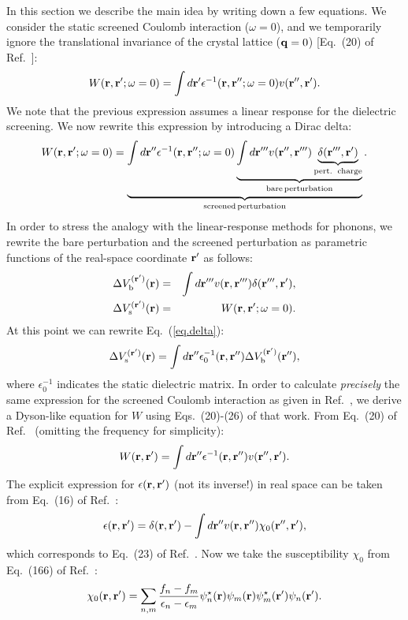 \documentclass[12pt]{article}
\def\q{{\bf q}}
\def\r{{\bf r}}
\def\rp{{\bf r}^\prime}
\def\rpp{{\bf r}^{\prime\prime}}
\def\rppp{{\bf r}^{\prime\prime\prime}}
\def\w{\omega}
\begin{document}
In this section we describe the main idea by writing down a few equations. We consider
the static screened Coulomb interaction ($\w=0$), and we temporarily ignore the translational
invariance of the crystal lattice ($\q=0$) [Eq.\ (20) of Ref.\ \cite{hl86}]:
  \begin{equation}
  W(\r,\rp;\w=0) = \int d\rp \epsilon^{-1}(\r,\rpp;\w=0) v(\rpp,\rp).
  \end{equation}
We note that the previous expression assumes a linear response for the dielectric screening.
We now rewrite this expression by introducing a Dirac delta:
  \begin{equation}\label{eq.delta}
  W(\r,\rp;\w=0) = \underbrace{ \int d\rpp \epsilon^{-1}(\r,\rpp;\w=0) 
  \underbrace{ \int d\rppp v(\rpp,\rppp) \underbrace{\delta(\rppp,\rp)}_{\rm pert.\ \, charge}}_{\rm bare \, perturbation}}
  _{\rm screened \, perturbation}.
  \end{equation}
In order to stress the analogy with the linear-response methods for phonons, we rewrite the bare perturbation
and the screened perturbation as parametric functions of the real-space coordinate $\rp$ as follows:
  \begin{eqnarray} \label{eq.deltavs}
  \Delta V_{\rm b}^{(\rp)} (\r)   &=& \int d\rppp v(\r,\rppp) \delta(\rppp,\rp),\\
  \Delta V_{\rm s}^{(\rp)} (\r) &=& W(\r,\rp;\w=0).
  \end{eqnarray}
At this point we can rewrite Eq.\ (\ref{eq.delta}):
   \begin{equation}\label{eq.delta2}
  \Delta V_{\rm s}^{(\rp)} (\r) = \int d\rpp \epsilon_0^{-1}(\r,\rpp) \Delta V_{\rm b}^{(\rp)} (\rpp),
  \end{equation}
where $\epsilon_0^{-1}$ indicates the static dielectric matrix.
In order to calculate {\it precisely} the same expression for the screened Coulomb interaction
as given in Ref.\ \cite{hl86}, we derive a Dyson-like equation for $W$ using Eqs.\ (20)-(26) of 
that work.
From Eq.\ (20) of Ref.\ \cite{hl86} (omitting the frequency for simplicity):
 \begin{equation} \label{eq.new.1}
 W(\r,\rp) = \int d\rpp \epsilon^{-1}(\r,\rpp) v(\rpp,\rp).  
 \end{equation}
The explicit expression for $\epsilon(\r,\rp)$ (not its inverse!) in real space can be taken from
Eq.\ (16) of Ref.\ \cite{tiago}:
 \begin{equation}  \label{eq.new.2}
 \epsilon(\r,\rp) = \delta(\r,\rp) - \int d\rpp v(\r,\rpp) \chi_0 (\rpp,\rp),
 \end{equation} 
which corresponds to Eq.\ (23) of Ref.\ \cite{hl86}. Now we take the susceptibility $\chi_0$ from
Eq.\ (166) of Ref.\ \cite{baroni}:
 \begin{equation} \label{eq.new.3}
 \chi_0 (\r,\rp) = \sum_{n,m} \frac{f_n-f_m}{\epsilon_n-\epsilon_m} \psi_n^\star (\r) \psi_m (\r) \psi_m^\star (\rp) \psi_n (\rp).
 \end{equation}
\end{document}
